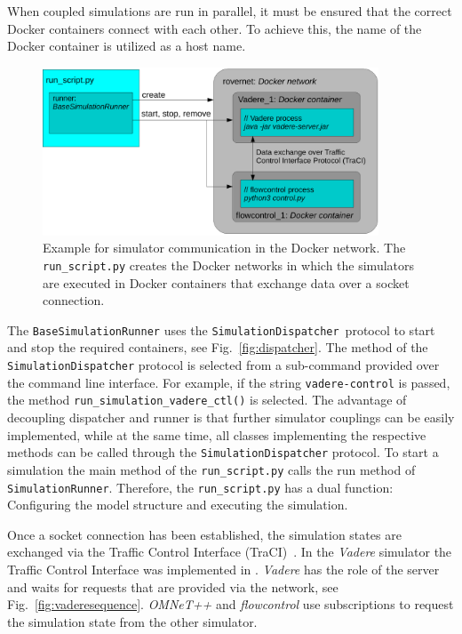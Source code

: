 When coupled simulations are run in parallel, it must be ensured that the correct Docker containers connect with each other. To achieve this, the name of the Docker container is utilized as a host name. 

\begin{figure}[hbt!]
\centering
\includegraphics[width=10cm]{../figures/crownet/dockerNetwork.pdf} 
\caption{Example for simulator communication in the Docker network. The \lstinline{run_script.py} creates the Docker networks in which the simulators are executed in Docker containers that exchange data over a socket connection. \textit{}}
\label{fig:dockernetwork}
\end{figure} 


The \lstinline{BaseSimulationRunner} uses the \lstinline{SimulationDispatcher}~protocol to start and stop the required containers, see Fig.~\ref{fig:dispatcher}. The method of the \lstinline{SimulationDispatcher} protocol is selected from a sub-command provided over the command line interface. For example, if the string \lstinline{vadere-control} is passed, the method \lstinline{run_simulation_vadere_ctl()} is selected. The advantage of  decoupling dispatcher and runner is that further simulator couplings can be easily implemented, while at the same time, all classes implementing the respective methods can be called through the \lstinline{SimulationDispatcher} protocol. To start a simulation the main method of the \lstinline{run_script.py} calls the run method of \lstinline{SimulationRunner}. Therefore, the \lstinline{run_script.py} has a dual function: Configuring the model structure and executing the simulation.

Once a socket connection has been established, the simulation states are exchanged via the Traffic Control Interface (TraCI)~\cite{wegener-2008-com}. In the \textit{Vadere} simulator the Traffic Control Interface was implemented in \cite{schuhbaeck-2019-com}. \textit{Vadere} has the role of the server and waits for requests that are provided via the network, see Fig.~\ref{fig:vaderesequence}. \textit{OMNeT++} and \textit{flowcontrol} use subscriptions to request the simulation state from the other simulator. 


